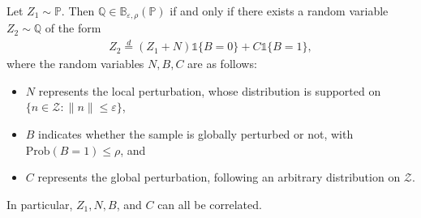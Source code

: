 \documentclass[11pt,a4paper]{article}
\begin{document}
\begin{proposition}
\label{prop:local:global}
Let $Z_1 \sim \mathbb P$. Then $\mathbb Q \in \mathbb B_{\varepsilon,\rho}(\mathbb P)$ if and only if there exists a random variable $Z_2 \sim \mathbb Q$ of the form
\begin{align}
\label{eq:local:global}
    Z_2 \overset{d}{=} (Z_1 + N)\mathds{1}\{B = 0\} + C \mathds{1}\{B = 1\},
\end{align}
where the random variables $N, B, C$ are as follows:
\begin{itemize}
    \item $N$ represents the local perturbation, whose distribution is supported on $\{n \in \mathcal Z: \|n\| \leq \varepsilon\}$,

    \item $B$ indicates whether the sample is globally perturbed or not, with $\text{Prob}(B = 1) \leq \rho$, and

    \item $C$ represents the global perturbation, following an arbitrary distribution on $\mathcal Z$.
\end{itemize}
In particular, $Z_1, N, B$, and $C$ can all be correlated.
\end{proposition}
\end{document}
